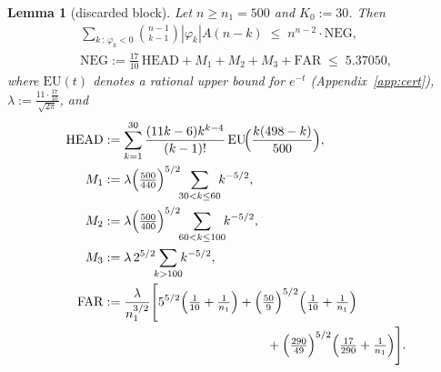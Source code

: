 \documentclass[11pt,a4paper]{amsart}
\theoremstyle{plain}
\newtheorem{lemma}[theorem]{Lemma}
\theoremstyle{definition}
\begin{document}
\begin{lemma}[discarded block]\label{lem:C4}
Let $n \ge n_1 = 500$ and $K_0 := 30$. Then
\begin{gather*}
  \sum_{k \,:\, \varphi_k<0}\binom{n-1}{k-1}|\varphi_k|A(n-k)
  \;\le\; n^{n-2}\cdot \mathrm{NEG},\\[4pt]
  \mathrm{NEG} := \tfrac{17}{10}\,\mathrm{HEAD}+M_1+M_2+M_3+\mathrm{FAR}
  \;\le\; 5.37050,
\end{gather*}
where $\mathrm{EU}(t)$ denotes a rational upper bound for $e^{-t}$
(Appendix~\ref{app:cert}), $\lambda := \frac{11\cdot\frac{17}{10}}{\sqrt{2\pi}}$,
and
\begin{align*}
  \mathrm{HEAD} &:= \sum_{k=1}^{30}\frac{(11k-6)k^{k-4}}{(k-1)!}\,
                    \mathrm{EU}\!\Big(\frac{k(498-k)}{500}\Big), \\
  M_1 &:= \lambda\Big(\tfrac{500}{440}\Big)^{5/2}
                 \!\!\sum_{30<k\le60}\!\!k^{-5/2}, \\
  M_2 &:= \lambda\Big(\tfrac{500}{400}\Big)^{5/2}
                 \!\!\sum_{60<k\le100}\!\!k^{-5/2}, \\
  M_3 &:= \lambda\,2^{5/2}\!\!\sum_{k>100}\!\!k^{-5/2}, \\
  \mathrm{FAR} &:= \frac{\lambda}{n_1^{3/2}}
     \Bigg[5^{5/2}\Big(\tfrac1{10}+\tfrac1{n_1}\Big)
        + \Big(\tfrac{50}{9}\Big)^{5/2}
          \Big(\tfrac1{10}+\tfrac1{n_1}\Big) \\
  &\hspace{4.5cm}
        + \Big(\tfrac{290}{49}\Big)^{5/2}
          \Big(\tfrac{17}{290}+\tfrac1{n_1}\Big)
     \Bigg].
\end{align*}
\end{lemma}
\end{document}
